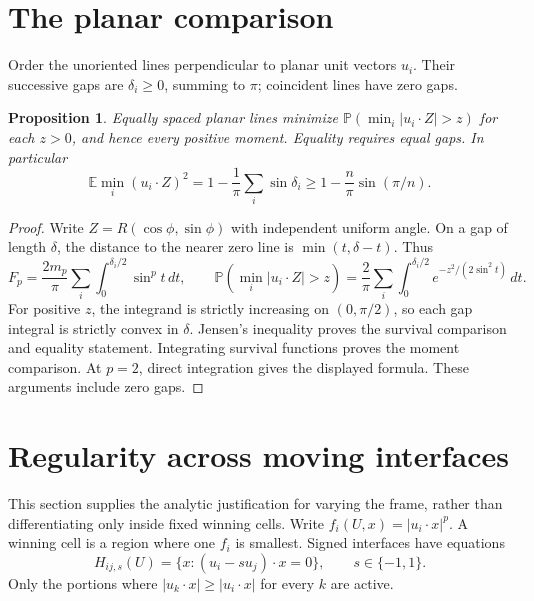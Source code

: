 \documentclass[11pt,a4paper]{article}
\newtheorem{proposition}[theorem]{Proposition}
\theoremstyle{remark}\newtheorem{remark}[theorem]{Remark}
\newcommand{\E}{\mathbb E}
\newcommand{\Prb}{\mathbb P}
\begin{document}
\section{The planar comparison}\label{sec:planar}
Order the unoriented lines perpendicular to planar unit vectors $u_i$. Their successive gaps are $\delta_i\ge0$, summing to $\pi$; coincident lines have zero gaps.
\begin{proposition}\label{prop:planar}
Equally spaced planar lines minimize $\Prb(\min_i|u_i\cdot Z|>z)$ for each $z>0$, and hence every positive moment. Equality requires equal gaps. In particular
\[
 \E\min_i(u_i\cdot Z)^2
 =1-\frac1\pi\sum_i\sin\delta_i
 \ge1-\frac n\pi\sin(\pi/n).
\]
\end{proposition}
\begin{proof}
Write $Z=R(\cos\phi,\sin\phi)$ with independent uniform angle. On a gap of length $\delta$, the distance to the nearer zero line is $\min(t,\delta-t)$. Thus
\[
 F_p=\frac{2m_p}{\pi}\sum_i\int_0^{\delta_i/2}\sin^p t\,dt,\qquad
 \Prb(\min_i|u_i\cdot Z|>z)
 =\frac2\pi\sum_i\int_0^{\delta_i/2}
   e^{-z^2/(2\sin^2t)}\,dt.
\]
For positive $z$, the integrand is strictly increasing on $(0,\pi/2)$, so each gap integral is strictly convex in $\delta$. Jensen's inequality proves the survival comparison and equality statement. Integrating survival functions proves the moment comparison. At $p=2$, direct integration gives the displayed formula. These arguments include zero gaps.
\end{proof}

\section{Regularity across moving interfaces}\label{sec:regularity}
This section supplies the analytic justification for varying the frame, rather than differentiating only inside fixed winning cells. Write $f_i(U,x)=|u_i\cdot x|^p$. A winning cell is a region where one $f_i$ is smallest. Signed interfaces have equations
\[
 H_{ij,s}(U)=\{x:(u_i-su_j)\cdot x=0\},\qquad s\in\{-1,1\}.
\]
Only the portions where $|u_k\cdot x|\ge|u_i\cdot x|$ for every $k$ are active.
\end{document}
